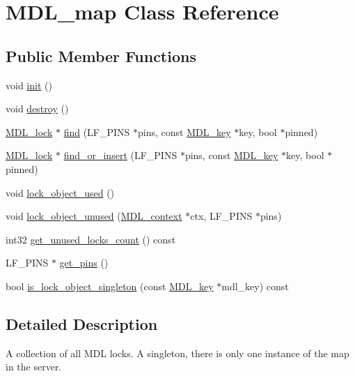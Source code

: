 \hypertarget{classMDL__map}{}\section{M\+D\+L\+\_\+map Class Reference}
\label{classMDL__map}
\subsection*{Public Member Functions}
\begin{DoxyCompactItemize}
\item 
void \mbox{\hyperlink{classMDL__map_aa98c33d4b7deccff3e9b2e5defed7928}{init}} ()
\item 
void \mbox{\hyperlink{classMDL__map_a7a127c75240de9ed98680f55a6c3c640}{destroy}} ()
\item 
\mbox{\hyperlink{classMDL__lock}{M\+D\+L\+\_\+lock}} $\ast$ \mbox{\hyperlink{classMDL__map_ae128210a2659d0f2e6781139e05e5465}{find}} (L\+F\+\_\+\+P\+I\+NS $\ast$pins, const \mbox{\hyperlink{structMDL__key}{M\+D\+L\+\_\+key}} $\ast$key, bool $\ast$pinned)
\item 
\mbox{\hyperlink{classMDL__lock}{M\+D\+L\+\_\+lock}} $\ast$ \mbox{\hyperlink{classMDL__map_a03f90967e861573bd4ce306d27ceb32c}{find\+\_\+or\+\_\+insert}} (L\+F\+\_\+\+P\+I\+NS $\ast$pins, const \mbox{\hyperlink{structMDL__key}{M\+D\+L\+\_\+key}} $\ast$key, bool $\ast$pinned)
\item 
void \mbox{\hyperlink{classMDL__map_aa03282e94ef98f16db215151ebf69844}{lock\+\_\+object\+\_\+used}} ()
\item 
void \mbox{\hyperlink{classMDL__map_a4451a25836d0e6fc7be87e33c8f9d0ec}{lock\+\_\+object\+\_\+unused}} (\mbox{\hyperlink{classMDL__context}{M\+D\+L\+\_\+context}} $\ast$ctx, L\+F\+\_\+\+P\+I\+NS $\ast$pins)
\item 
int32 \mbox{\hyperlink{classMDL__map_af4c5043a0a8b8deac2a1d330c174056d}{get\+\_\+unused\+\_\+locks\+\_\+count}} () const
\item 
L\+F\+\_\+\+P\+I\+NS $\ast$ \mbox{\hyperlink{classMDL__map_a1f761cb64053bfe1f1239be0095efcf5}{get\+\_\+pins}} ()
\item 
bool \mbox{\hyperlink{classMDL__map_a7ecc606e53a2b8bfa5714dcba3e795f2}{is\+\_\+lock\+\_\+object\+\_\+singleton}} (const \mbox{\hyperlink{structMDL__key}{M\+D\+L\+\_\+key}} $\ast$mdl\+\_\+key) const
\end{DoxyCompactItemize}


\subsection{Detailed Description}
A collection of all M\+DL locks. A singleton, there is only one instance of the map in the server. 

